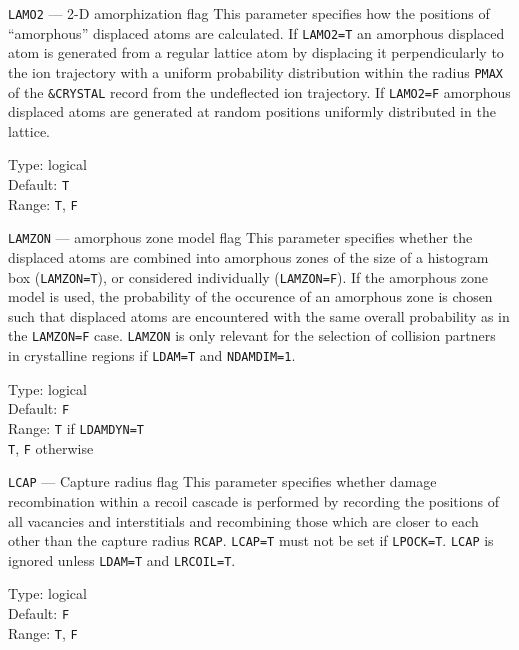 \begin{keydescription}{\texttt{LAMO2} --- 2-D amorphization flag}
%
  This parameter specifies how the positions of ``amorphous'' displaced atoms
  are calculated. If \texttt{LAMO2=T} an amorphous displaced atom is generated
  from a regular lattice atom by displacing it perpendicularly to the ion
  trajectory with a uniform probability distribution within the radius
  \texttt{PMAX} of the \texttt{\&CRYSTAL} record from the undeflected ion 
  trajectory. If \texttt{LAMO2=F} amorphous displaced atoms are generated at 
  random positions uniformly distributed in the lattice.

  \begin{keytab}
    Type:    \> logical \\
    Default: \> \texttt{T} \\
    Range:   \> \texttt{T}, \texttt{F}
  \end{keytab}
\end{keydescription}

\begin{keydescription}{\texttt{LAMZON} --- amorphous zone model flag}
%
  This parameter specifies whether the displaced atoms are combined into
  amorphous zones of the size of a histogram box (\texttt{LAMZON=T}), or
  considered individually (\texttt{LAMZON=F}). If the amorphous zone
  model is used, the probability of the occurence of an amorphous zone
  is chosen such that displaced atoms are encountered with the same
  overall probability as in the \texttt{LAMZON=F} case. \texttt{LAMZON}
  is only relevant for the selection of collision partners in 
  crystalline regions if \texttt{LDAM=T} and \texttt{NDAMDIM=1}.
  \begin{keytab}
    Type:    \> logical \\
    Default: \> \texttt{F} \\
    Range:   \> \texttt{T} if \texttt{LDAMDYN=T} \\
             \> \texttt{T}, \texttt{F} otherwise
  \end{keytab}
\end{keydescription}

\begin{keydescription}{\texttt{LCAP} --- Capture radius flag}
%
  This parameter specifies whether damage recombination within a recoil
  cascade is performed by recording the positions of all vacancies and
  interstitials and recombining those which are closer to each other
  than the capture radius \texttt{RCAP}. \texttt{LCAP=T} must not be set if
  \texttt{LPOCK=T}. \texttt{LCAP} is ignored unless \texttt{LDAM=T} and 
  \texttt{LRCOIL=T}.
  \begin{keytab}
    Type:    \> logical \\
    Default: \> \texttt{F} \\
    Range:   \> \texttt{T}, \texttt{F}
  \end{keytab}
\end{keydescription}

